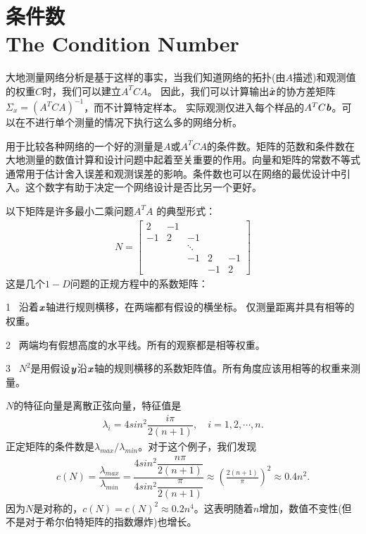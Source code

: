 \section[条件数]{条件数\\The Condition Number}
大地测量网络分析是基于这样的事实，当我们知道网络的拓扑(由$A$描述)和观测值的权重$C$时，我们可以建立$A^{T}CA$。 因此，我们可以计算输出$\hat{\textbf{\textit{x}}}$的协方差矩阵$ \Sigma_{x}=(A^{T}CA)^{-1} $，而不计算特定样本。 实际观测仅进入每个样品的$A^{T}C\textbf{\textit{b}}$。可以在不进行单个测量的情况下执行这么多的网络分析。

用于比较各种网络的一个好的测量是$A$或$A^{T}CA$的条件数。矩阵的范数和条件数在大地测量的数值计算和设计问题中起着至关重要的作用。向量和矩阵的常数不等式通常用于估计舍入误差和观测误差的影响。条件数也可以在网络的最优设计中引入。这个数字有助于决定一个网络设计是否比另一个更好。

以下矩阵是许多最小二乘问题$A^{T}A$ 的典型形式：
\begin{align*}
N=
\begin{bmatrix}
2     & -1          &        &        & \\
-1     &  2      &  -1        &        & \\
&        &       \ddots      &        & \\
&        &         -1     &  2     & -1 \\
&        &          &       -1     &  2
\end{bmatrix}
\end{align*} 
这是几个$1-D$问题的正规方程中的系数矩阵：

1 \ 沿着$\textbf{\textit{x}}$轴进行规则横移，在两端都有假设的横坐标。 仅测量距离并具有相等的权重。

2 \ 两端均有假想高度的水平线。所有的观察都是相等权重。

3 \ $N^{2}$是用假设$\textbf{\textit{y}}$沿$\textbf{\textit{x}}$轴的规则横移的系数矩阵值。所有角度应该用相等的权重来测量。

$N$的特征向量是离散正弦向量，特征值是
\begin{align}
\lambda_{i}=4sin^{2}\dfrac{i\pi}{2(n+1)}, \quad  i=1,2,\cdots,n. 
\end{align}
正定矩阵的条件数是$ \lambda_{max}/\lambda_{min} $。对于这个例子，我们发现
\begin{align*}
c(N)=\dfrac{\lambda_{max}}{\lambda_{min}}=\dfrac{4sin^{2}\dfrac{n\pi}{2(n+1)}}{4sin^{2}\dfrac{\pi}{2(n+1)}}\approx(\frac{2(n+1)}{\pi})^{2}\approx0.4n^{2}.
\end{align*}
因为$N$是对称的，$ c(N)=c(N)^{2}\approx0.2n^{4} $。这表明随着$n$增加，数值不变性(但不是对于希尔伯特矩阵的指数爆炸)也增长。

